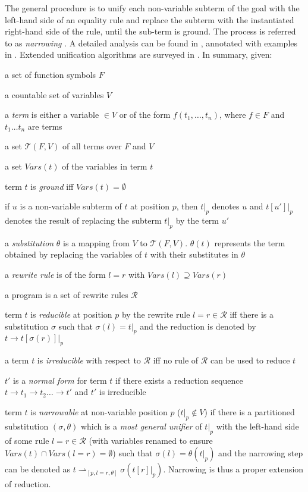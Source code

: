 The general procedure is to unify each non-variable subterm of the goal with the left-hand
side of an equality rule and replace the subterm with the instantiated right-hand side of the
rule, until the sub-term is ground.  The process is referred to as \textit{narrowing}
\cite{RKKL85}.  A detailed analysis can be found in \cite{JD89},
annotated with examples in \cite{Han94}.  Extended unification algorithms
are surveyed in \cite{DvH87}. In summary, given:
\begin{list}{}{\setlength{\itemsep}{0cm}}
\item{a set of function symbols $F$}
\item{a countable set of variables $V$}
\item{a \textit{term} is either a variable $\in V$ or
  of the form $f(t_1,\ldots,t_n)$, where $f \in F$ and
  $t_1 \ldots t_n$ are terms}
\item{a set $\mathcal{T}(F,V)$ of all terms over
  $F$ and $V$}
\item{a set $\mathit{Vars}(t)$ of the variables in term $t$}
\item{term $t$ is \textit{ground} iff $\mathit{Vars}(t) = \emptyset$}
\item{if $u$ is a non-variable subterm of $t$ at position $p$, then
  $t|_p$ denotes $u$ and $t[u']|_p$ denotes the result of replacing
  the subterm $t|_p$ by the term $u'$}
\item{a \textit{substitution} $\theta$ is a mapping from $V$ to
  $\mathcal{T}(F,V)$.  $\theta(t)$ represents the term obtained by
  replacing the variables of $t$ with their substitutes in $\theta$}
\item{a \textit{rewrite rule} is of the form $l = r$ with
  $\mathit{Vars}(l) \supseteq \mathit{Vars}(r)$}
\item{a program is a set of rewrite rules $\mathcal{R}$}
\item{term $t$ is \textit{reducible} at position $p$ by the rewrite rule
  $l = r \in \mathcal{R}$
  iff there is a substitution $\sigma$ such that $\sigma(l)=t|_p$ and
  the reduction is denoted by $t \rightarrow t[\sigma(r)]|_p$}
\item{a term $t$ is \textit{irreducible} with respect to $\mathcal{R}$
  iff no rule of $\mathcal{R}$ can be used to reduce $t$}
\item{$t'$ is a \textit{normal form} for term $t$ if there exists a
  reduction sequence $t \rightarrow t_1 \rightarrow t_2 \ldots
  \rightarrow t'$ and $t'$ is irreducible}
\item{term $t$ is \textit{narrowable} at non-variable position $p$
  ($t|_p \notin V$) if there is a partitioned substitution $(\sigma ,\theta )$
  which is
  a \textit{most general unifier} of $t|_p$ with the left-hand side of
  some rule $l = r \in \mathcal{R}$ (with variables renamed to ensure
  $\mathit{Vars}(t) \cap \mathit{Vars}(l = r) = \emptyset$)
  such that $\sigma(l)=\theta(t|_p)$ and
  the narrowing step can be denoted as
  $t \rightharpoonup_{[p,l=r,\theta]} \sigma(t[r]|_p)$.  Narrowing
  is thus a proper extension of reduction.}
\end{list}
